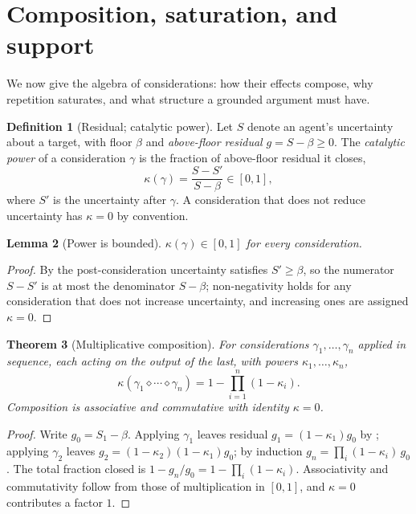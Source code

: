 \documentclass[11pt,a4paper]{article}
\theoremstyle{clstyle}
\newtheorem{theorem}{Theorem}[section]
\newtheorem{lemma}[theorem]{Lemma}
\theoremstyle{definition}
\newtheorem{definition}[theorem]{Definition}
\theoremstyle{remark}
\newcommand{\flo}{\beta}
\begin{document}
\section{Composition, saturation, and support}
\label{sec:compose}

We now give the algebra of considerations: how their effects compose, why
repetition saturates, and what structure a grounded argument must have.

\begin{definition}[Residual; catalytic power]
\label{def:power}
Let $S$ denote an agent's uncertainty about a target, with floor $\flo$ and
\emph{above-floor residual} $g=S-\flo\ge0$. The \emph{catalytic power} of a
consideration $\gamma$ is the fraction of above-floor residual it closes,
\[
\kappa(\gamma)=\frac{S-S'}{S-\flo}\in[0,1],
\]
where $S'$ is the uncertainty after $\gamma$. A consideration that does not
reduce uncertainty has $\kappa=0$ by convention.
\end{definition}

\begin{lemma}[Power is bounded]
\label{lem:powerbound}
$\kappa(\gamma)\in[0,1]$ for every consideration.
\end{lemma}

\begin{proof}
By  the post-consideration uncertainty satisfies
$S'\ge\flo$, so the numerator $S-S'$ is at most the denominator $S-\flo$;
non-negativity holds for any consideration that does not increase
uncertainty, and increasing ones are assigned $\kappa=0$.
\end{proof}

\begin{theorem}[Multiplicative composition]
\label{thm:multiplicative}
For considerations $\gamma_1,\dots,\gamma_n$ applied in sequence, each acting
on the output of the last, with powers $\kappa_1,\dots,\kappa_n$,
\[
\kappa(\gamma_1\diamond\cdots\diamond\gamma_n)
=1-\prod_{i=1}^{n}(1-\kappa_i).
\]
Composition is associative and commutative with identity $\kappa=0$.
\end{theorem}

\begin{proof}
Write $g_0=S_1-\flo$. Applying $\gamma_1$ leaves residual
$g_1=(1-\kappa_1)g_0$ by ; applying $\gamma_2$ leaves
$g_2=(1-\kappa_2)(1-\kappa_1)g_0$; by induction
$g_n=\prod_i(1-\kappa_i)\,g_0$. The total fraction closed is
$1-g_n/g_0=1-\prod_i(1-\kappa_i)$. Associativity and commutativity follow
from those of multiplication in $[0,1]$, and $\kappa=0$ contributes a factor
$1$.
\end{proof}
\end{document}
